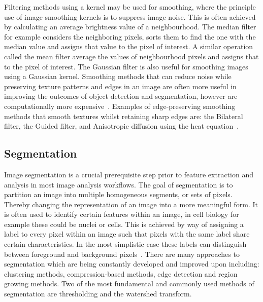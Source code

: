 Filtering methods using a kernel  may be used for smoothing, where the principle use of image smoothing kernels is to suppress image noise. This is often achieved by calculating an average brightness value of a neighbourhood. The median filter for example considers the neighboring pixels, sorts them to find the one with the median value and assigns that value to the pixel of interest. A similar operation called the mean filter average the values of neighbourhood pixels and assigns that to the pixel of interest. The Gaussian filter is also useful for smoothing images using a Gaussian kernel. Smoothing methods that can reduce noise while preserving texture patterns and edges in an image are often more useful in improving the outcomes of object detection and segmentation, however are computationally more expensive~\cite{Sonka2007}. Examples of edge-preserving smoothing methods that smooth textures whilst retaining sharp edges are: the Bilateral filter, the Guided filter, and Anisotropic diffusion using the heat equation~\cite{Pal2015}.

\subsection{Segmentation}
\label{introduction:image_processing:segmentation}
Image segmentation is a crucial prerequisite step prior to feature extraction and analysis in most image analysis workflows. The goal of segmentation is to partition an image into multiple homogeneous segments, or sets of pixels. Thereby changing the representation of an image into a more meaningful form. It is often used to identify certain features within an image, in cell biology for example these could be nuclei or cells. This is achieved by way of assigning a label to every pixel within an image such that pixels with the same label share certain characteristics. In the most simplistic case these labels can distinguish between foreground and background pixels~\cite{Russ2006}. There are many approaches to segmentation which are being constantly developed and improved upon including: clustering methods, compression-based methods, edge detection and region growing methods. Two of the most fundamental and commonly used methods of segmentation are thresholding and the watershed transform.

